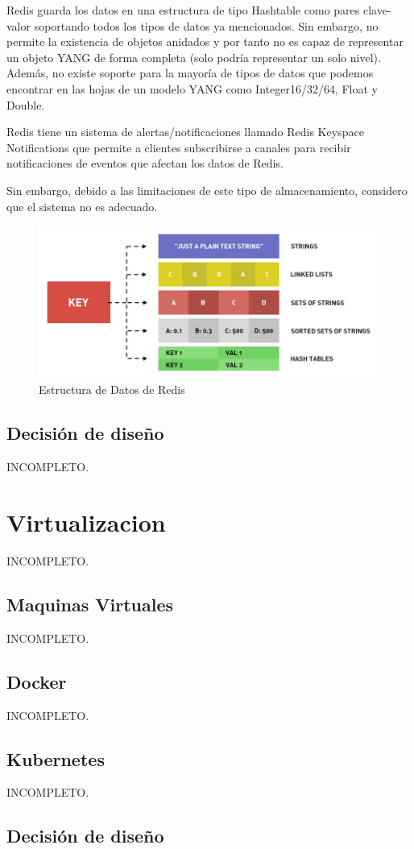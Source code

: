 Redis guarda los datos en una estructura de tipo Hashtable como pares clave-valor soportando todos los
tipos de datos ya mencionados. Sin embargo, no permite la existencia de objetos anidados y por tanto no es capaz de representar un objeto YANG de forma completa (solo podría representar un solo nivel).
Además, no existe soporte para la mayoría de tipos de datos que podemos encontrar en las hojas de un modelo YANG como Integer16/32/64, Float y Double.

Redis tiene un sistema de alertas/notificaciones llamado Redis Keyspace Notifications que permite
a clientes subscribirse a canales para recibir notificaciones de eventos que afectan los datos de Redis. 

Sin embargo, debido a las limitaciones de este tipo de almacenamiento, considero que el sistema no es adecuado.

\begin{figure}
    \centering
    \includegraphics[width=15cm]{graphics/redis-data-structure-types.jpeg}
    \caption{Estructura de Datos de Redis}
    \label{fig:redis_estructura}
\end{figure}

\subsection{Decisión de diseño}
\Large{INCOMPLETO.}




\section{Virtualizacion}
\Large{INCOMPLETO.}
  \subsection{Maquinas Virtuales}
  \Large{INCOMPLETO.}
  \subsection{Docker}
  \Large{INCOMPLETO.}
  \subsection{Kubernetes}
  \Large{INCOMPLETO.}
\subsection{Decisión de diseño}

